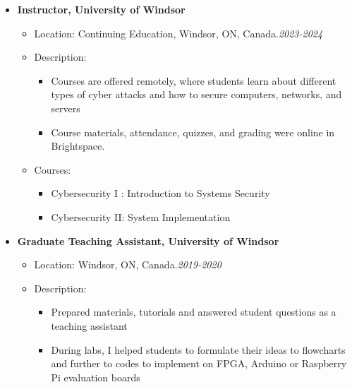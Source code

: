 \begin {itemize}
\begin {itemize}
      \item [$\bullet$] \bf {\mtf \normalsize  Instructor,  University of Windsor} \mdseries
            \begin {itemize}
                \item [-]  {  Location: Continuing Education, Windsor, ON, Canada.\small \hspace{2.1cm}\textit{2023-2024}\normalsize} 
                \item [-]   {   Description:} 
                    \begin {itemize}   
                        \item [\textbullet] Courses are offered remotely, where students learn about different types of cyber attacks and how to secure computers, networks, and servers
                        \item [\textbullet] Course materials, attendance, quizzes, and grading were online in Brightspace.
                    \end {itemize}
                    \item [-]   {   Courses:} 
                    \begin {itemize}   
                        \item [\textbullet]  Cybersecurity I : Introduction to Systems Security 
                        \item [\textbullet] Cybersecurity II: System Implementation
                    \end {itemize}
            \end {itemize} \vspace{0.3cm}
     \item [$\bullet$] \bf {\mtf \normalsize  Graduate Teaching Assistant, University of Windsor} \mdseries
            \begin {itemize}
                \item [-]  {  Location: Windsor, ON, Canada.\small \hspace{5.7cm}\textit{2019-2020}\normalsize} 
                \item [-]   {   Description:} 
                    \begin {itemize}
                        \item [\textbullet]  Prepared materials, tutorials and answered student questions as a teaching assistant
                        \item [\textbullet]  During  labs, I 
helped students to formulate their ideas to flowcharts and further to codes to implement on FPGA, Arduino or Raspberry Pi evaluation boards

\end{itemize}
\end{itemize}
\end{itemize}
\end{itemize}
